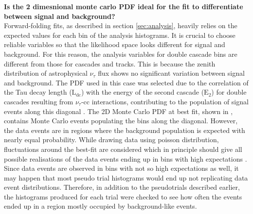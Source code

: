 \textbf{Is the 2 dimesnional monte carlo PDF ideal for the fit to differentiate between signal and background?}\\

Forward-folding fits, as described in section \ref{sec:analysis}, heavily relies on the expected values for each bin of the analysis histograms. It is crucial to choose reliable variables so that the likelihood space looks different for signal and background. For this reason, the analysis variables for double cascade bins are different from those for cascades and tracks. This is because the zenith distribution of astrophysical $\nu_{\tau}$ flux shows no significant variation between signal and background. The PDF used in this case was selected due to the correlation of the Tau decay length ($\mathrm{L}_{\mathrm{dc}}$) with the energy of the second cascade ($\mathrm{E}_{2}$) for double cascades resulting from $\nu_{\tau}$-cc interactions, contributing to the population of signal events along this diagonal . The 2D Monte Carlo PDF at best fit, shown in , contains Monte Carlo events populating the bins along the diagonal. However, the data events are in regions where the background population is expected with nearly equal probability. While drawing data using poisson distribution, fluctuations around the best-fit are considered which in principle should give all possible realisations of the data events ending up in bins with high expectations . Since data events are observed in bins with not so high expectations as well, it may happen that most pseudo trial histograms would end up not replicating data event distributions. Therefore, in addition to the pseudotrials described earlier, the histograms produced for each trial were checked to see how often the events ended up in a region mostly occupied by background-like events. 

